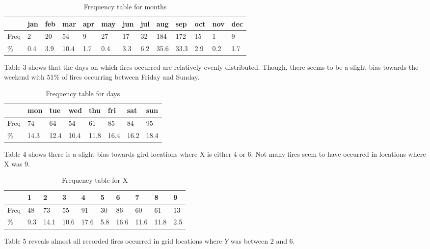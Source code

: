 \documentclass[11pt]{report}
\begin{document}
\begin{table}[!htb]
\begin{center}
    \begin{tabular}{lllllllllllll}
	&jan &feb &mar &apr &may &jun &jul &aug &sep &oct &nov &dec\\ \hline 
	Freq& 2&  20&  54&   9&   27&  17&  32& 184& 172&  15&   1&   9 \\ 
	\%& 0.4&  3.9& 10.4&  1.7&  0.4&  3.3&  6.2& 35.6& 33.3&  2.9&  0.2&  1.7 \\
	\hline 
    \end{tabular}
		\caption {Frequency table for months}
\end{center}
\end{table}

\noindent Table 3 shows that the days on which fires occurred are relatively evenly distributed. Though, there seems to be a slight bias towards the weekend with 51\% of fires occurring between Friday and Sunday.


\begin{table}[!htb]
\begin{center}
    \begin{tabular}{llllllll}
	&mon &tue &wed &thu &fri &sat &sun\\ \hline 
	Freq&  74& 64& 54& 61& 85& 84& 95 \\
	\%& 14.3& 12.4& 10.4& 11.8& 16.4& 16.2& 18.4 \\
	\hline
    \end{tabular}
		\caption {Frequency table for days}
\end{center}
\end{table}


\noindent Table 4 shows there is a slight bias towards gird locations where X is either 4 or 6. Not many fires seem to have occurred in locations where X was 9.
\begin{table}[!htb]
\begin{center}
    \begin{tabular}{llllllllll}
	&1 &2 &3 &4 &5 &6 &7 & 8 &9\\ \hline 
	Freq&  48& 73& 55& 91& 30& 86& 60& 61& 13  \\
	\%& 9.3& 14.1& 10.6& 17.6&  5.8& 16.6& 11.6& 11.8&  2.5  \\
	\hline
    \end{tabular}
		\caption {Frequency table for X}
\end{center}
\end{table}

\noindent Table 5 reveals almost all recorded fires occurred in grid locations where $Y$ was between 2 and 6.
\end{document}
